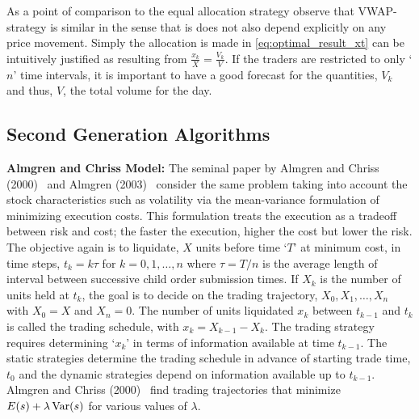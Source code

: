 As a point of comparison to the equal allocation strategy observe that VWAP-strategy is similar in the sense that is does not also depend explicitly on any price movement. Simply the allocation is made in \eqref{eq:optimal_result_xt} can be intuitively justified as resulting from $\frac{x_k}{X}= \frac{V_k}{V}$. If the traders are restricted to only `$n$' time intervals, it is important to have a good forecast for the quantities, $V_k$ and thus, $V$, the total volume for the day. 


\subsection{Second Generation Algorithms \label{subsec:almchrmodel}}

\noindent\textbf{Almgren and Chriss Model:} The seminal paper by Almgren and Chriss (2000)~\cite{alm2000} and Almgren (2003)~\cite{almgren2003} consider the same problem taking into account the stock characteristics such as volatility via the mean-variance formulation of minimizing execution costs. This formulation treats the execution as a tradeoff between risk and cost; the faster the execution, higher the cost but lower the risk. The objective again is to liquidate, $X$ units before time `$T$' at minimum cost, in time steps, $t_k = k \tau$ for $k = 0,1,\ldots, n$ where $\tau = T/n$ is the average length of interval between successive child order submission times. If $X_k$ is the number of units held at $t_k$, the goal is to decide on the trading trajectory, $X_0, X_1, \ldots, X_n$ with $X_0=X$ and $X_n=0$. The number of units liquidated $x_k$ between $t_{k-1}$ and $t_k$ is called the trading schedule, with $x_k = X_{k-1} - X_k$. The trading strategy requires determining `$x_k$' in terms of information available at time $t_{k-1}$. The static strategies determine the trading schedule in advance of starting trade time, $t_0$ and the dynamic strategies depend on information available up to $t_{k-1}$. Almgren and Chriss (2000)~\cite{alm2000} find trading trajectories that minimize $E(s)+\lambda \operatorname{Var}(s)$ for various values of $\lambda$.


